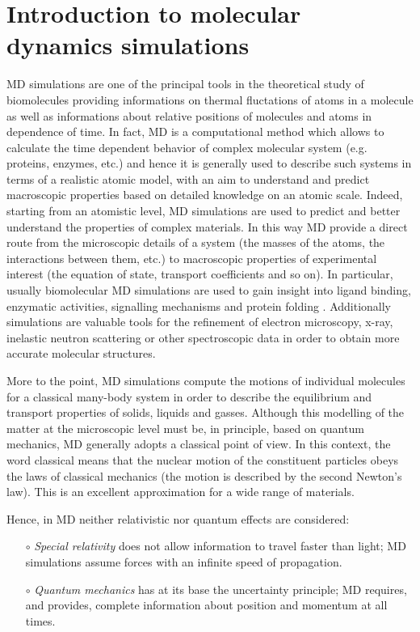 \section{Introduction to molecular dynamics simulations}
MD simulations are one of the principal tools in the theoretical study of biomolecules providing informations on thermal fluctations of atoms in a molecule as well as informations about relative positions of molecules and atoms in dependence of time. In fact, MD is a computational method which allows to calculate the time dependent behavior of complex molecular system (e.g. proteins, enzymes, etc.) and hence it is generally used to describe such systems in terms of a realistic atomic model, with an aim to understand and predict macroscopic properties based on detailed knowledge on an atomic scale. Indeed, starting from an atomistic level, MD simulations are used to predict and better understand the properties of complex materials. In this way MD provide a direct route from the microscopic details of a system (the masses of the atoms, the interactions between them, etc.) to macroscopic properties of experimental interest (the equation of state, transport coefficients and so on). In particular, usually biomolecular MD simulations are used to gain insight into ligand binding, enzymatic activities, signalling mechanisms and protein folding \cite{ref:NAMD-VMD_Kukol}. Additionally simulations are valuable tools for the refinement of electron microscopy, x-ray, inelastic neutron scattering or other spectroscopic data in order to obtain more accurate molecular structures.

More to the point, MD simulations compute the motions of individual molecules for a classical many-body system in order to describe the equilibrium and transport properties of solids, liquids and gasses.
Although this modelling of the matter at the microscopic level must be, in principle, based on quantum mechanics, MD generally adopts a classical point of view.
In this context, the word classical means that the nuclear motion of the constituent particles obeys the laws of classical mechanics (the motion is described by the second Newton's law).
This is an excellent approximation for a wide range of materials.

Hence, in MD neither relativistic nor quantum effects are considered:
\begin{itemize}
\item[$\circ$] \textit{Special relativity} does not allow information to travel faster than light; MD simulations assume forces with an infinite speed of propagation.
\item[$\circ$] \textit{Quantum mechanics} has at its base the uncertainty principle; MD requires, and provides, complete information about position and momentum at all times.
\end{itemize}

